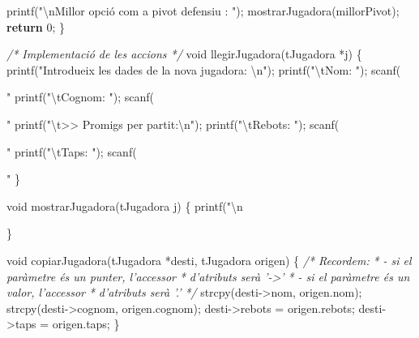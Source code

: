 \documentclass[]{book}
\newenvironment{Shaded}{\begin{snugshade}}{\end{snugshade}}
\newcommand{\DataTypeTok}[1]{\textcolor[rgb]{0.13,0.29,0.53}{#1}}
\newcommand{\DecValTok}[1]{\textcolor[rgb]{0.00,0.00,0.81}{#1}}
\newcommand{\SpecialCharTok}[1]{\textcolor[rgb]{0.00,0.00,0.00}{#1}}
\newcommand{\StringTok}[1]{\textcolor[rgb]{0.31,0.60,0.02}{#1}}
\newcommand{\CommentTok}[1]{\textcolor[rgb]{0.56,0.35,0.01}{\textit{#1}}}
\newcommand{\ControlFlowTok}[1]{\textcolor[rgb]{0.13,0.29,0.53}{\textbf{#1}}}
\newcommand{\NormalTok}[1]{#1}
\begin{document}
\begin{Shaded}
\begin{Highlighting}[]
\NormalTok{    printf(}\StringTok{"}\SpecialCharTok{\textbackslash{}n}\StringTok{Millor opció com a pivot defensiu : "}\NormalTok{);}
\NormalTok{    mostrarJugadora(millorPivot);}
    \ControlFlowTok{return} \DecValTok{0}\NormalTok{;}
\NormalTok{\}}

\CommentTok{/* Implementació de les accions */}
\DataTypeTok{void}\NormalTok{ llegirJugadora(tJugadora *j) \{}
\NormalTok{    printf(}\StringTok{"Introdueix les dades de la nova jugadora: }\SpecialCharTok{\textbackslash{}n}\StringTok{"}\NormalTok{);}
\NormalTok{    printf(}\StringTok{"}\SpecialCharTok{\textbackslash{}t}\StringTok{Nom: "}\NormalTok{);}
\NormalTok{    scanf(}\StringTok{"%
\NormalTok{    printf(}\StringTok{"}\SpecialCharTok{\textbackslash{}t}\StringTok{Cognom: "}\NormalTok{);}
\NormalTok{    scanf(}\StringTok{"%
\NormalTok{    printf(}\StringTok{"}\SpecialCharTok{\textbackslash{}t}\StringTok{>> Promigs per partit:}\SpecialCharTok{\textbackslash{}n}\StringTok{"}\NormalTok{);}
\NormalTok{    printf(}\StringTok{"}\SpecialCharTok{\textbackslash{}t}\StringTok{Rebots: "}\NormalTok{);}
\NormalTok{    scanf(}\StringTok{"%
\NormalTok{    printf(}\StringTok{"}\SpecialCharTok{\textbackslash{}t}\StringTok{Taps: "}\NormalTok{);}
\NormalTok{    scanf(}\StringTok{"%
\NormalTok{\}}

\DataTypeTok{void}\NormalTok{ mostrarJugadora(tJugadora j) \{}
\NormalTok{    printf(}\StringTok{"}\SpecialCharTok{\textbackslash{}n}\StringTok{%
\NormalTok{\}}

\DataTypeTok{void}\NormalTok{ copiarJugadora(tJugadora *desti, tJugadora origen) \{}
    \CommentTok{/* Recordem: }
\CommentTok{     * - si el paràmetre és un punter, l'accessor }
\CommentTok{     * d'atributs serà '->'}
\CommentTok{     * - si el paràmetre és un valor, l'accessor}
\CommentTok{     * d'atributs serà '.'}
\CommentTok{     */}
\NormalTok{    strcpy(desti->nom, origen.nom);}
\NormalTok{    strcpy(desti->cognom, origen.cognom);}
\NormalTok{    desti->rebots = origen.rebots;}
\NormalTok{    desti->taps = origen.taps;}
\NormalTok{\}}

}}}}}
\end{Highlighting}
\end{Shaded}
\end{document}
